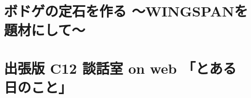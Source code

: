\documentclass[10pt,a4j,dvipdfmx,openany,uplatex]{jsbook}
\begin{document}
  \section{ボドゲの定石を作る 〜WINGSPANを題材にして〜}
  

  
  \newpage
  \section{出張版 C12 談話室 on web 「とある日のこと」}
  
  

  \newpage
  
  

  \newpage
  

  \newpage
  

  \newpage
  

  \newpage
  
  
  \newpage
  

  
\end{document}
